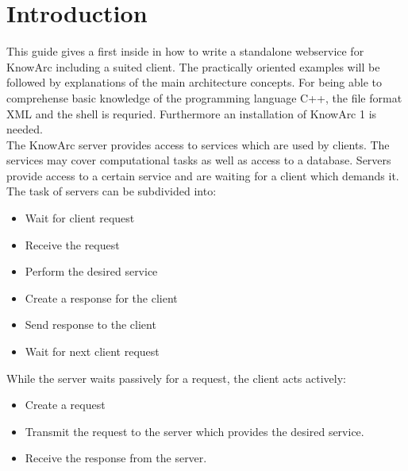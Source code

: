 
\chapter{Introduction}

This guide gives a first inside in how to write a standalone webservice for KnowArc including a suited client.
The practically oriented examples will be followed by explanations of the main architecture concepts.
For being able to comprehense basic knowledge of the programming language C++, the file format XML and the shell is requried.
Furthermore an installation of KnowArc 1 is needed.\\


The KnowArc server provides access to services which are used by clients. The services may cover computational tasks as well 
as access to a database. %
Servers provide access to a certain service and are waiting for a client which demands it. The task of servers can be subdivided into:
\begin{itemize}
 \item Wait for client request
 \item Receive the request
 \item Perform the desired service
 \item Create a response for the client
 \item Send response to the client
 \item Wait for next client request
\end{itemize}
While the server waits passively for a request, the client acts actively:
\begin{itemize}
 \item Create a request
 \item Transmit the request to the server which provides the desired service.
 \item Receive the response from the server.
 \end{itemize}
\forcelinebreak

